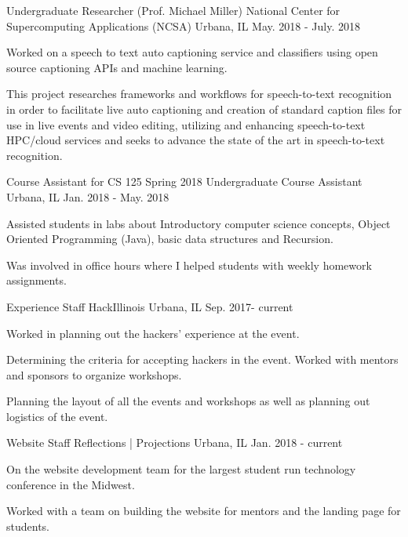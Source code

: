 \begin{cventries}
  
  \cventry
    {Undergraduate Researcher (Prof. Michael Miller)}
    {National Center for Supercomputing Applications (NCSA) }
    {Urbana, IL}
    {May. 2018 - July. 2018}
    {
      \begin{cvitems}
        \item {Worked on a speech to text auto captioning service and classifiers using open source captioning APIs and machine learning.}
        \item {This project researches frameworks and workflows for speech-to-text recognition in order to facilitate live auto captioning and creation of standard caption files for use in live events and video editing, utilizing and enhancing speech-to-text HPC/cloud services and seeks to advance the state of the art in speech-to-text recognition.}
      \end{cvitems} 
    }
    
  \cventry
    {Course Assistant for CS 125 Spring 2018}
    {Undergraduate Course Assistant}
    {Urbana, IL}
    {Jan. 2018 - May. 2018}
    {
      \begin{cvitems}
        \item {Assisted students in labs about Introductory computer science concepts, Object Oriented Programming (Java), basic data structures and Recursion.}
        \item {Was involved in office hours where I helped students with weekly homework assignments.}
      \end{cvitems}
    }
    
  \cventry
    {Experience Staff}
    {HackIllinois}
    {Urbana, IL}
    {Sep. 2017- current}
    {
      \begin{cvitems}
        \item {Worked in planning out the hackers' experience at the event.}
        \item {Determining the criteria for accepting hackers in the event. Worked with mentors and sponsors to organize workshops.}
        \item {Planning the layout of all the events and workshops as well as planning out logistics of the event.}
      \end{cvitems}
      \vspace*{-0.4cm}
    }
  \cventry
    {Website Staff}
    {Reflections | Projections}
    {Urbana, IL}
    {Jan. 2018 - current}
    {
      \begin{cvitems}
        \item {On the website development team for the largest student run technology conference in the Midwest.}
        \item {Worked with a team on building the website for mentors and the landing page for students.}
      \end{cvitems}
      \vspace*{0.55cm}
    }
    
\end{cventries}
